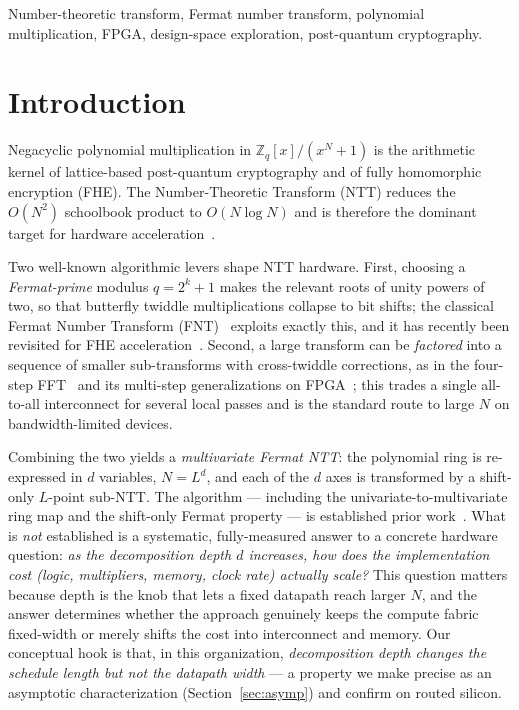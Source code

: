 \documentclass[conference]{IEEEtran}
\begin{document}
\begin{IEEEkeywords}
Number-theoretic transform, Fermat number transform, polynomial multiplication,
FPGA, design-space exploration, post-quantum cryptography.
\end{IEEEkeywords}

\section{Introduction}
Negacyclic polynomial multiplication in $\mathbb{Z}_q[x]/(x^{N}+1)$ is the
arithmetic kernel of lattice-based post-quantum cryptography and of fully
homomorphic encryption (FHE). The Number-Theoretic Transform (NTT) reduces the
$O(N^{2})$ schoolbook product to $O(N\log N)$ and is therefore the dominant
target for hardware acceleration~\cite{cooleytukey,longa2016}.

Two well-known algorithmic levers shape NTT hardware. First, choosing a
\emph{Fermat-prime} modulus $q=2^{k}+1$ makes the relevant roots of unity powers
of two, so that butterfly twiddle multiplications collapse to bit shifts; the
classical Fermat Number Transform (FNT)~\cite{agarwalburrus} exploits exactly
this, and it has recently been revisited for FHE
acceleration~\cite{kim2024fermat,xing2025}. Second, a large transform can be
\emph{factored} into a sequence of smaller sub-transforms with cross-twiddle
corrections, as in the four-step FFT~\cite{bailey1990} and its multi-step
generalizations on FPGA~\cite{kocer2024,wanggao2023}; this trades a single
all-to-all interconnect for several local passes and is the standard route to
large $N$ on bandwidth-limited devices.

Combining the two yields a \emph{multivariate Fermat NTT}: the polynomial ring is
re-expressed in $d$ variables, $N=L^{d}$, and each of the $d$ axes is transformed
by a shift-only $L$-point sub-NTT. The algorithm --- including the
univariate-to-multivariate ring map and the shift-only Fermat
property --- is established prior work~\cite{kim2024fermat,xing2025}. What is
\emph{not} established is a systematic, fully-measured answer to a concrete
hardware question: \emph{as the decomposition depth $d$ increases, how does the
implementation cost (logic, multipliers, memory, clock rate) actually scale?}
This question matters because depth is the knob that lets a fixed datapath reach
larger $N$, and the answer determines whether the approach genuinely keeps the
compute fabric fixed-width or merely shifts the cost into interconnect and memory.
Our conceptual hook is that, in this organization, \emph{decomposition depth
changes the schedule length but not the datapath width} --- a property we make
precise as an asymptotic characterization (Section~\ref{sec:asymp}) and confirm
on routed silicon.
\end{document}
